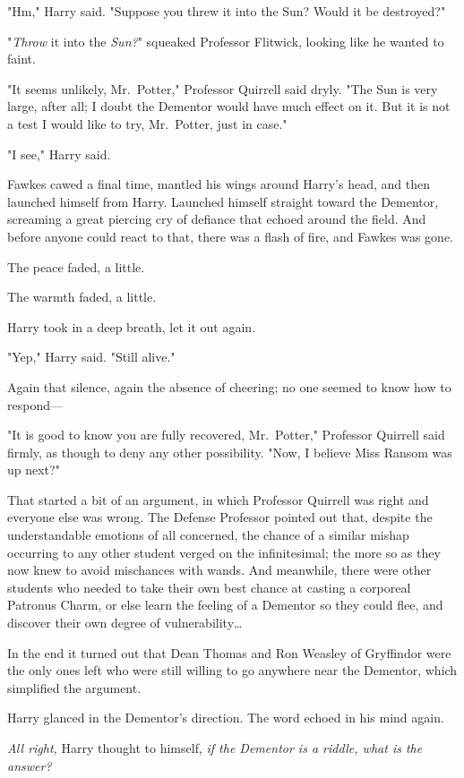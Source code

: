 "Hm," Harry said. "Suppose you threw it into the Sun? Would it be destroyed?"

"\emph{Throw} it into the \emph{Sun?}" squeaked Professor Flitwick, looking
like he wanted to faint.

"It seems unlikely, Mr.~Potter," Professor Quirrell said dryly. "The Sun is
very large, after all; I doubt the Dementor would have much effect on it. But
it is not a test I would like to try, Mr.~Potter, just in case."

"I see," Harry said.

Fawkes cawed a final time, mantled his wings around Harry's head, and then
launched himself from Harry. Launched himself straight toward the Dementor,
screaming a great piercing cry of defiance that echoed around the field. And
before anyone could react to that, there was a flash of fire, and Fawkes was
gone.

The peace faded, a little.

The warmth faded, a little.

Harry took in a deep breath, let it out again.

"Yep," Harry said. "Still alive."

Again that silence, again the absence of cheering; no one seemed to know how to
respond---

"It is good to know you are fully recovered, Mr.~Potter," Professor Quirrell
said firmly, as though to deny any other possibility. "Now, I believe Miss
Ransom was up next?"

That started a bit of an argument, in which Professor Quirrell was right and
everyone else was wrong. The Defense Professor pointed out that, despite the
understandable emotions of all concerned, the chance of a similar mishap
occurring to any other student verged on the infinitesimal; the more so as they
now knew to avoid mischances with wands. And meanwhile, there were other
students who needed to take their own best chance at casting a corporeal
Patronus Charm, or else learn the feeling of a Dementor so they could flee, and
discover their own degree of vulnerability{\ldots}

In the end it turned out that Dean Thomas and Ron Weasley of Gryffindor were
the only ones left who were still willing to go anywhere near the Dementor,
which simplified the argument.

Harry glanced in the Dementor's direction. The word echoed in his mind again.

\emph{All right,} Harry thought to himself, \emph{if the Dementor is a riddle,
what is the answer?}

